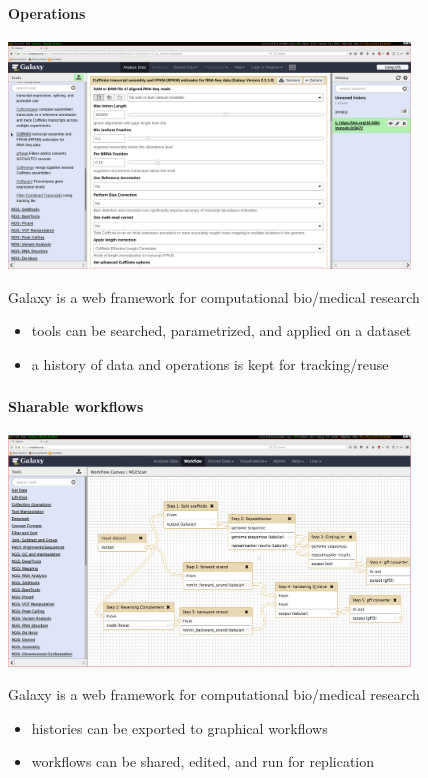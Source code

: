 \documentclass[xcolor=dvipsnames]{beamer}
\begin{document}
\begin{frame}
  \frametitle{\two}
  \framesubtitle{Operations}
  \vspace{-0.2cm}
  \begin{center}
    \includegraphics[width=0.80\textwidth]{images/screenshot_usegalaxy_cufflinks}
  \end{center}
  Galaxy is a web framework for computational bio/medical research
  \begin{itemize}
    \item tools can be searched, parametrized, and applied on a dataset
    \item a history of data and operations is kept for tracking/reuse
  \end{itemize}
\end{frame}

\begin{frame}
  \frametitle{\two}
  \framesubtitle{Sharable workflows}
  \vspace{-0.2cm}
  \begin{center}
    \includegraphics[width=0.80\textwidth]{images/screenshot_usegalaxy_workflow}
  \end{center}
  Galaxy is a web framework for computational bio/medical research
  \begin{itemize}
    \item histories can be exported to graphical workflows
    \item workflows can be shared, edited, and run for replication
  \end{itemize}
\end{frame}
\end{document}

